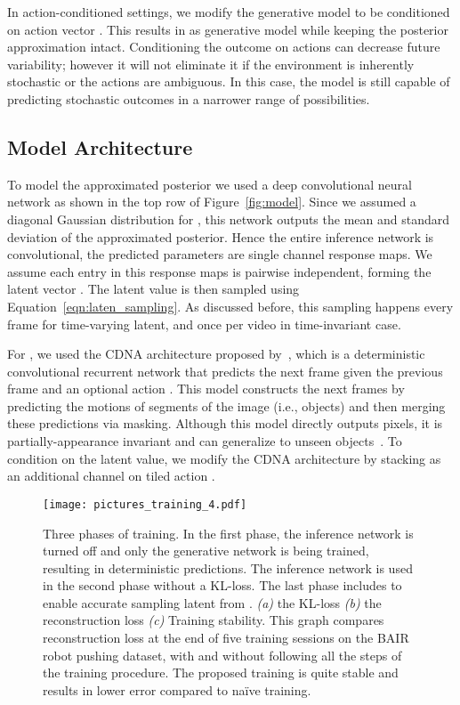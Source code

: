 \documentclass{article} \usepackage{iclr2018_conference,times}
\begin{document}
In action-conditioned settings, we modify the generative model to be conditioned on action vector . This results in  as generative model while keeping the posterior approximation intact. Conditioning the outcome on actions can decrease future variability; however it will not eliminate it if the environment is inherently stochastic or the actions are ambiguous. In this case, the model is still capable of predicting stochastic outcomes in a narrower range of possibilities. 






\subsection{Model Architecture}
To model the approximated posterior  we used a deep convolutional neural network
as shown in the top row of Figure~\ref{fig:model}. Since we assumed a diagonal Gaussian distribution for , this network outputs the mean  and standard deviation  of the approximated posterior. Hence the entire inference network is convolutional, the predicted parameters are  single channel response maps. We assume each entry in this response maps is pairwise independent, forming the latent vector . The latent value is then sampled using Equation~\ref{eqn:laten_sampling}. As discussed before, this sampling happens every frame for time-varying latent, and once per video in time-invariant case.



For , we used the CDNA architecture proposed by~\citet{finn2016unsupervised}, which is a deterministic convolutional recurrent network that predicts the next frame  given the previous frame  and an optional action .
This model constructs the next frames by predicting the motions of segments of the image (i.e., objects) and then merging these predictions via masking. Although this model directly outputs pixels, it is partially-appearance invariant and can generalize to unseen objects~\citep{finn2016unsupervised}.
To condition on the latent value, we modify the CDNA architecture by stacking  as an additional channel on tiled action . 





\begin{figure}[t]
  \centering
\texttt{[image: pictures\_training\_4.pdf]}
\caption{Three phases of training. In the first phase, the inference network is turned off and only the generative network is being trained, resulting in deterministic predictions. The inference network is used in the second phase without a KL-loss. The last phase includes  to enable accurate sampling latent from . \textit{(a)} the KL-loss \textit{(b)} the reconstruction loss \textit{(c)} Training stability. This graph compares reconstruction loss at the end of five training sessions on the BAIR robot pushing dataset, with and without following all the steps of the training procedure. The proposed training is quite stable and results in lower error compared to na\"ive training.}
\label{fig:training}
\end{figure}
\end{document}
